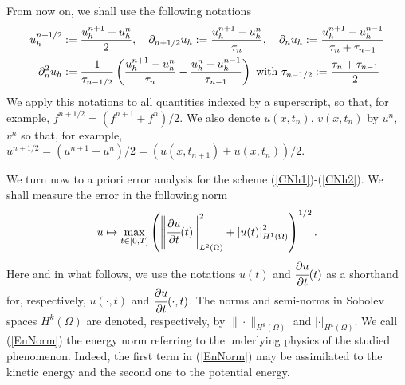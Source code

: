 \documentclass{imanum}
\begin{document}
From now on, we shall use the following notations
\begin{align}\label{notation}
u_h^{n+1/2}& :=\frac{u_h^{n+1}+u_h^{n}}{2},
\quad
\partial _{n+1/2}u_h:=\frac{u_h^{n+1}-u_h^{n}}{\tau_n},
\quad
\partial _{n}u_h:=\frac{u_h^{n+1}-u_h^{n-1}}{\tau_n+\tau_{n-1}} \\
\notag \partial _{n}^{2}{u_h}&:=\frac{1}{\tau_{n-1/2}}\left(\frac{u_h^{n+1}-u_h^{n}}{\tau_n}-\frac{u_h^{n}-u_h^{n-1}}{\tau_{n-1}}\right)
\text{ with } \tau_{n-1/2}:=\frac{\tau_n+\tau_{n-1}}{2}
\end{align}
We apply this notations to all quantities indexed by a superscript, so that, for example, $f^{n+1/2}=({f^{n+1}+f^n})/{2}$.
We also denote $u (x,t_n)$, $v(x,t_n)$ by $u^n$, $v^n$ so that, for example, $u^{n+1/2}=\left({u^{n+1}+u^n}\right)/{2}=\left(u(x,t_{n+1})+u(x,t_n)\right)/{2}$. 

We turn now to a priori error analysis for the scheme (\ref{CNh1})-(\ref{CNh2}). We shall measure the error in the following norm
\begin{equation}\label{EnNorm}
u \mapsto \max_{t\in[0,T]}\left(\left\|\cfrac{\partial u}{\partial t} (t)\right\|_{L^2(\Omega)}^{2}+\left\vert u(t)\right\vert^{2}_{H^1(\Omega)}\right) ^{1/2}.
\end{equation}
Here and in what follows, we use  the notations $u(t)$ and $\cfrac{\partial u}{\partial t} (t)$ as a shorthand for, respectively, $u(\cdot,t)$ and $\cfrac{\partial u}{\partial t} (\cdot,t)$. The norms and semi-norms in Sobolev spaces $H^k(\Omega)$ are denoted, respectively, by $\|\cdot\|_{H^k(\Omega)}$ and $|\cdot|_{H^k(\Omega)}$.
We call (\ref{EnNorm}) the energy norm referring to the underlying physics of the studied phenomenon. Indeed, the first term in (\ref{EnNorm}) may be assimilated to the kinetic energy and the second one to the potential energy.
\end{document}
